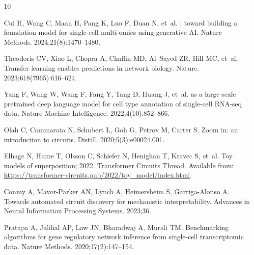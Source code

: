 \documentclass[10pt,letterpaper]{article}
\providecommand{\DIFaddbegin}{} %
\providecommand{\DIFdelend}{} %
\newcommand{\DIFaddincludegraphics}[2][]{{\color{blue}\fbox{\DIFOincludegraphics[#1]{#2}}}} %
\DeclareRobustCommand{\DIFaddbegin}{\DIFOaddbegin \let\includegraphics\DIFaddincludegraphics} %
\DeclareRobustCommand{\DIFdelend}{\DIFOaddend \let\includegraphics\DIFOincludegraphics} %
\begin{document}


\DIFdelend \DIFaddbegin \begin{thebibliography}{10}

Cui H, Wang C, Maan H, Pang K, Luo F, Duan N, et~al.
: toward building a foundation model for single-cell
  multi-omics using generative {AI}.
\newblock Nature Methods. 2024;21(8):1470--1480.

Theodoris CV, Xiao L, Chopra A, Chaffin MD, Al~Sayed ZR, Hill MC, et~al.
\newblock Transfer learning enables predictions in network biology.
\newblock Nature. 2023;618(7965):616--624.

Yang F, Wang W, Wang F, Fang Y, Tang D, Huang J, et~al.
 as a large-scale pretrained deep language model for cell
  type annotation of single-cell {RNA-seq} data.
\newblock Nature Machine Intelligence. 2022;4(10):852--866.

Olah C, Cammarata N, Schubert L, Goh G, Petrov M, Carter S.
\newblock Zoom in: an introduction to circuits.
\newblock Distill. 2020;5(3):e00024.001.

Elhage N, Hume T, Olsson C, Schiefer N, Henighan T, Kravec S, et~al. Toy
  models of superposition; 2022.
\newblock Transformer Circuits Thread.
\newblock Available from:
  \url{https://transformer-circuits.pub/2022/toy_model/index.html}.

Conmy A, Mavor-Parker AN, Lynch A, Heimersheim S, Garriga-Alonso A.
\newblock Towards automated circuit discovery for mechanistic interpretability.
\newblock Advances in Neural Information Processing Systems. 2023;36.

Pratapa A, Jalihal AP, Law JN, Bharadwaj A, Murali TM.
\newblock Benchmarking algorithms for gene regulatory network inference from
  single-cell transcriptomic data.
\newblock Nature Methods. 2020;17(2):147--154.


\end{thebibliography}
\end{document}
